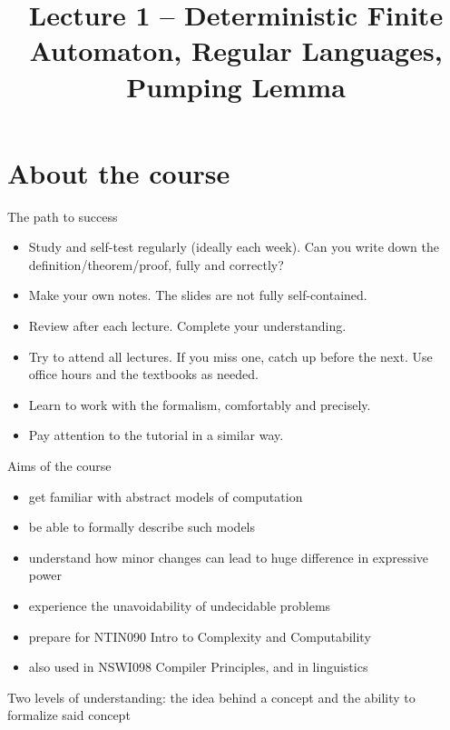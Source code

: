 \documentclass[handout]{beamer}
\title{Lecture 1 -- Deterministic Finite Automaton, Regular Languages, Pumping Lemma}
\begin{document}
\frame{\titlepage}


\section{About the course}


\begin{frame}{The path to success}

    \begin{itemize}    
        \item \alert{Study and self-test regularly (ideally each week).} Can you write down the definition/theorem/proof, fully and correctly?
        \item \alert{Make your own notes.} The slides are not fully self-contained.
        \item \alert{Review after each lecture.} Complete your understanding.
        \item \alert{Try to attend all lectures.} If you miss one, catch up before the next. Use office hours and the textbooks as needed.
        \item \alert{Learn to work with the formalism,} comfortably and precisely.
        \item \alert{Pay attention to the tutorial} in a similar way.

    \end{itemize}

\end{frame}


\begin{frame}{Aims of the course}

    \begin{itemize}
        \item get familiar with abstract models of computation
        \item be able to \alert{formally} describe such models
        \item understand how minor changes can lead to huge difference in expressive power
        \item experience the unavoidability of undecidable problems
        \item prepare for NTIN090 Intro to Complexity and Computability
        \item also used in NSWI098 Compiler Principles, and in linguistics
    \end{itemize}
    
    Two levels of understanding: the \alert{idea} behind a concept and the ability to \alert{formalize} said concept

\end{frame}
\end{document}

